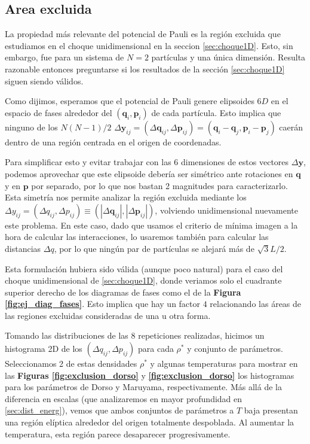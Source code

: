 \subsection{Area excluida}

La propiedad más relevante del potencial de Pauli es la región excluida que estudiamos en el choque unidimensional en la seccion \ref{sec:choque1D}.
Esto, sin embargo, fue para un sistema de $N=2$ partículas y una única dimensión.
Resulta razonable entonces preguntarse si los resultados de la sección \ref{sec:choque1D} siguen siendo válidos.

Como dijimos, esperamos que el potencial de Pauli genere elipsoides $6D$ en el espacio de fases alrededor del $(\mathbf{q}_i,\mathbf{p}_i)$ de cada partícula.
Esto implica que ninguno de los $N(N-1)/2$ $\Delta \mathbf{y}_{ij} = (\Delta \mathbf{q}_{ij}, \Delta \mathbf{p}_{ij}) = (\mathbf{q}_i-\mathbf{q}_j,\mathbf{p}_i-\mathbf{p}_j)$ caerán dentro
de una región centrada en el origen de coordenadas.

Para simplificar esto y evitar trabajar con las 6 dimensiones de estos vectores $\Delta \mathbf{y}$, podemos aprovechar que este elipsoide debería ser simétrico ante rotaciones en $\mathbf{q}$
y en $\mathbf{p}$ por separado, por lo que nos bastan 2 magnitudes para caracterizarlo.
Esta simetría nos permite analizar la región excluida mediante los $\Delta y_{ij} = (\Delta q_{ij},\Delta p_{ij}) \equiv (|\Delta \mathbf{q}_{ij}|, |\Delta \mathbf{p}_{ij}|)$, volviendo
unidimensional nuevamente este problema.
En este caso, dado que usamos el criterio de mínima imagen a la hora de calcular las interacciones, lo usaremos también para calcular las distancias $\Delta q$, por lo que ningún
par de partículas se alejará más de $\sqrt{3}L/2$.

Esta formulación hubiera sido válida (aunque poco natural) para el caso del choque unidimensional de \ref{sec:choque1D}, donde veriamos solo el cuadrante superior derecho de los diagramas de
fases como el de la \textbf{Figura \ref{fig:ej_diag_fases}}.
Esto implica que hay un factor $4$ relacionando las áreas de las regiones excluidas consideradas de una u otra forma.

Tomando las distribuciones de las 8 repeticiones realizadas, hicimos un histograma 2D de los $(\Delta q_{ij},\Delta p_{ij})$ para cada $\rho^*$ y conjunto de parámetros.
Seleccionamos 2 de estas densidades $\rho^*$ y algunas temperaturas para mostrar en las \textbf{Figuras \ref{fig:exclusion_dorso}} y \textbf{\ref{fig:exclusion_dorso}} los histogramas
para los parámetros de Dorso y Maruyama, respectivamente.
Más allá de la diferencia en escalas (que analizaremos en mayor profundidad en \ref{sec:dist_energ}), vemos que ambos conjuntos de parámetros a $T$ baja presentan una región elíptica alrededor
del origen totalmente despoblada.
Al aumentar la temperatura, esta región parece desaparecer progresivamente.

